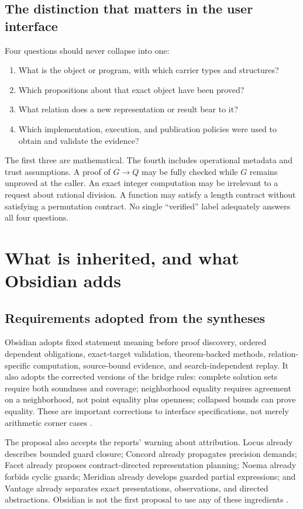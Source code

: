 \documentclass[11pt,a4paper]{article}
\theoremstyle{plain}\newtheorem{proposition}{Proposition}[section]
\theoremstyle{definition}\newtheorem{definition}[proposition]{Definition}
\theoremstyle{remark}\newtheorem{remark}[proposition]{Remark}
\begin{document}
\subsection{The distinction that matters in the user interface}
Four questions should never collapse into one:
\begin{enumerate}
\item What is the object or program, with which carrier types and structures?
\item Which propositions about that exact object have been proved?
\item What relation does a new representation or result bear to it?
\item Which implementation, execution, and publication policies were used to obtain and validate the evidence?
\end{enumerate}
The first three are mathematical. The fourth includes operational metadata and trust assumptions. A proof of \(G\to Q\) may be fully checked while \(G\) remains unproved at the caller. An exact integer computation may be irrelevant to a request about rational division. A function may satisfy a length contract without satisfying a permutation contract. No single ``verified'' label adequately answers all four questions.

\section{What is inherited, and what Obsidian adds}\label{sec:delta}
\subsection{Requirements adopted from the syntheses}
Obsidian adopts fixed statement meaning before proof discovery, ordered dependent obligations, exact-target validation, theorem-backed methods, relation-specific computation, source-bound evidence, and search-independent replay. It also adopts the corrected versions of the bridge rules: complete solution sets require both soundness and coverage; neighborhood equality requires agreement on a neighborhood, not point equality plus openness; collapsed bounds can prove equality. These are important corrections to interface specifications, not merely arithmetic corner cases \cite{synA,synB}.

The proposal also accepts the reports' warning about attribution. Locus already describes bounded guard closure; Concord already propagates precision demands; Facet already proposes contract-directed representation planning; Noema already forbids cyclic guards; Meridian already develops guarded partial expressions; and Vantage already separates exact presentations, observations, and directed abstractions. Obsidian is not the first proposal to use any of these ingredients \cite{synA,synB}.
\end{document}
